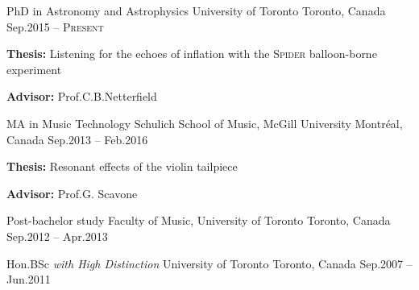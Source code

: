 

\begin{cventries}

  \cventry
    {PhD in Astronomy and Astrophysics}
    {University of Toronto}
    {Toronto, Canada}
    {Sep.\@ 2015 -- \textsc{Present}}
    {
      \begin{cvitems}
        \item {\textbf{Thesis:} Listening for the echoes of inflation with the \textsc{Spider} balloon-borne experiment}
        \item {\textbf{Advisor:} Prof.\@ C.\@ B.\@ Netterfield}
      \end{cvitems}
    }
    
  \cventry
    {MA in Music Technology}
    {Schulich School of Music, McGill University}
    {Montr\'{e}al, Canada}
    {Sep.\@ 2013 -- Feb.\@ 2016}
    {
      \begin{cvitems}
        \item {\textbf{Thesis:} Resonant effects of the violin tailpiece}
        \item {\textbf{Advisor:} Prof.\@ G. Scavone}
      \end{cvitems}
    }
    
  \cventry
    {Post-bachelor study}
    {Faculty of Music, University of Toronto}
    {Toronto, Canada}
    {Sep.\@ 2012 -- Apr.\@ 2013}
    {}
    
  \vspace{-0.4cm}
  \cventry
    {Hon.BSc \textit{with High Distinction}}
    {University of Toronto}
    {Toronto, Canada}
    {Sep.\@ 2007 -- Jun.\@ 2011}
    {}
    
  \vspace{-0.4cm}
\end{cventries}
